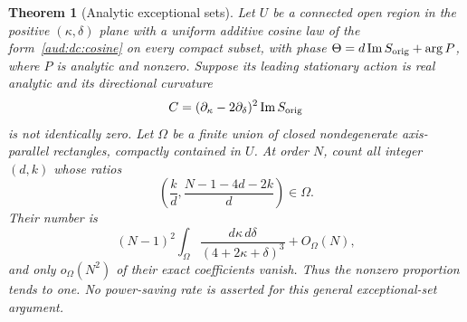 \documentclass[11pt,a4paper]{article}
\numberwithin{equation}{section}
\newtheorem{theorem}{Theorem}[section]
\begin{document}
\begin{theorem}[Analytic exceptional sets]\label{aud:dc:density}
Let $U$ be a connected open region in the positive $(\kappa,\delta)$ plane with a uniform additive cosine law of the form~\eqref{aud:dc:cosine} on every compact subset, with phase $\Theta=d\operatorname{Im}S_{\rm orig}+\arg P$, where $P$ is analytic and nonzero. Suppose its leading stationary action is real analytic and its directional curvature
\[
 C=(\partial_\kappa-2\partial_\delta)^2\operatorname{Im}S_{\rm orig}
\]
is not identically zero. Let $\Omega$ be a finite union of closed nondegenerate axis-parallel rectangles, compactly contained in $U$. At order $N$, count all integer $(d,k)$ whose ratios
\[
 \left(\frac kd,\frac{N-1-4d-2k}{d}\right)\in\Omega.
\]
Their number is
\begin{equation}\label{aud:dc:area}
 (N-1)^2\int_\Omega\frac{d\kappa\,d\delta}{(4+2\kappa+\delta)^3}
 +O_\Omega(N),
\end{equation}
and only $o_\Omega(N^2)$ of their exact coefficients vanish. Thus the nonzero proportion tends to one. No power-saving rate is asserted for this general exceptional-set argument.
\end{theorem}
\end{document}
